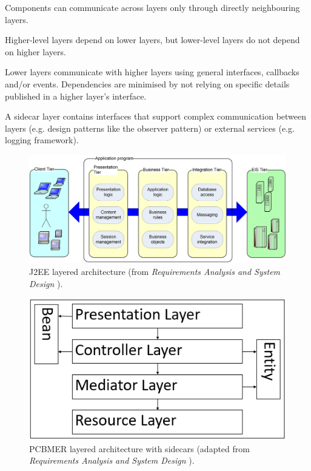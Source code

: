 \documentclass{slide}
\begin{document}
{Components can communicate across layers only through directly neighbouring layers.}

{Higher-level layers depend on lower layers, but lower-level layers do not depend on higher layers.}

{Lower layers communicate with higher layers using general interfaces, callbacks and/or events.
Dependencies are minimised by not relying on specific details published in a higher layer’s interface.}

{A sidecar layer contains interfaces that support complex communication between layers
(e.g. design patterns like the observer pattern) or external services (e.g. logging framework).}



\begin{frame}
\begin{figure}
    \begin{adjustwidth}{-7mm}{-7mm}
        \includegraphics[width=0.96\paperwidth]{images/j2ee-arch.png}
    \end{adjustwidth}
    \caption{J2EE layered architecture (from \textit{Requirements Analysis and System Design} \cite{rasd2007}).}
\end{figure}
\end{frame}


\begin{frame}
\begin{figure}
    \centering
    \includegraphics[width=0.5\paperwidth]{images/pcbmer.png}
    \caption{PCBMER layered architecture with sidecars (adapted from \textit{Requirements Analysis and System Design} \cite{rasd2007}).}
\end{figure}
\end{frame}
\end{document}
